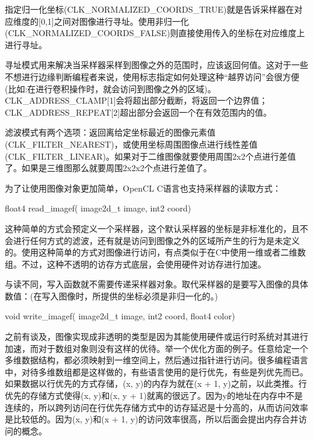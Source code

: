 指定归一化坐标(CLK\_\allowbreak{}NORMALIZED\_\allowbreak{}COORDS\_\allowbreak{}TRUE)就是告诉采样器在对应维度的[0,1]之间对图像进行寻址。使用非归一化(CLK\_\allowbreak{}NORMALIZED\_\allowbreak{}COORDS\_\allowbreak{}FALSE)则直接使用传入的坐标在对应维度上进行寻址。

寻址模式用来解决当采样器采样到图像之外的范围时，应该返回何值。这对于一些不想进行边缘判断编程者来说，使用标志指定如何处理这种“越界访问”会很方便(比如:在进行卷积操作时，就会访问到图像之外的区域)。CLK\_\allowbreak{}ADDRESS\_\allowbreak{}CLAMP[1]会将超出部分截断，将返回一个边界值；CLK\_\allowbreak{}ADDRESS\_\allowbreak{}REPEAT[2]超出部分会返回一个在有效范围内的值。

滤波模式有两个选项：返回离给定坐标最近的图像元素值(CLK\_\allowbreak{}FILTER\_\allowbreak{}NEAREST)，或使用坐标周围图像点进行线性差值(CLK\_\allowbreak{}FILTER\_\allowbreak{}LINEAR)。如果对于二维图像就要使用周围2x2个点进行差值了。如果是三维图那么就要周围2x2x2个点进行差值了。

为了让使用图像对象更加简单，OpenCL C语言也支持采样器的读取方式：

\begin{codebox}[cpp]
float4
read_imagef(
  image2d_t image,
  int2 coord)
\end{codebox}

这种简单的方式会预定义一个采样器，这个默认采样器的坐标是非标准化的，且不会进行任何方式的滤波，还有就是访问到图像之外的区域所产生的行为是未定义的。使用这种简单的方式对图像进行访问，有点类似于在C中使用一维或者二维数组。不过，这种不透明的访存方式底层，会使用硬件对访存进行加速。

与读不同，写入函数就不需要传递采样器对象。取代采样器的是要写入图像的具体数值：(在写入图像时，所提供的坐标必须是非归一化的。)

\begin{codebox}[cpp]
void
write_imagef(
  image2d_t image,
  int2 coord,
  float4 color)
\end{codebox}

之前有谈及，图像实现成非透明的类型是因为其能使用硬件或运行时系统对其进行加速，而对于数组对象则没有这样的优待。举一个优化方面的例子。任意给定一个多维数据结构，都必须映射到一维空间上，然后通过指针进行访问。很多编程语言中，对待多维数组都是这样做的，有些语言使用的是行优先，有些是列优先而已。如果数据以行优先的方式存储，(x, y)的内存为就在(x + 1, y)之前，以此类推。行优先的存储方式使得(x, y)和(x, y + 1)就离的很远了。因为y的地址在内存中不是连续的，所以跨列访问在行优先存储方式中的访存延迟是十分高的，从而访问效率是比较低的。因为(x, y)和(x + 1, y)的访问效率很高，所以后面会提出内存合并访问的概念。

